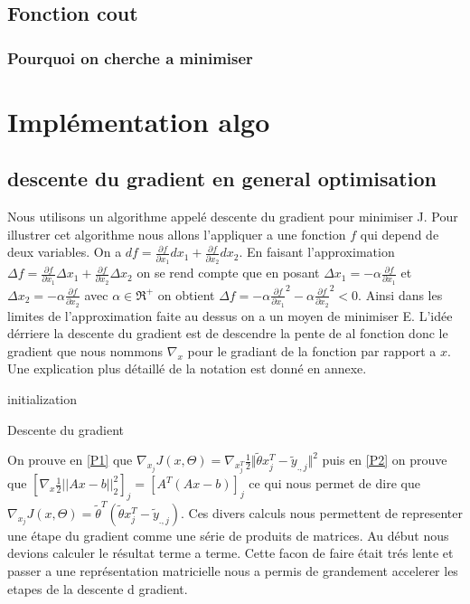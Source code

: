 \documentclass[a4paper,10pt]{article}
\begin{document}
\subsection{Fonction cout}
\subsubsection{Pourquoi on cherche a minimiser}
\section{Implémentation algo}
\subsection{descente du gradient en general optimisation}
Nous utilisons un algorithme appelé descente du gradient pour minimiser J. Pour illustrer cet algorithme nous allons l'appliquer 
a une fonction $f$ qui depend de deux variables.%
 On a $df = \frac{\partial f}{\partial x_{1}}d x_{1} + \frac{\partial f}{\partial x_{2}}dx_{2}$. En faisant l'approximation
 $\Delta f = \frac{\partial f}{\partial x_{1}}\Delta  x_{1} + \frac{\partial f}{\partial x_{2}}\Delta x_{2}$ on se rend compte
 que en posant $\Delta x_{1} = -\alpha \frac{\partial f}{\partial x_{1}}$
 et $\Delta x_{2} = -\alpha \frac{\partial f}{\partial x_{2}}$ avec $\alpha \in \Re^{+}$
 on obtient $\Delta f = -\alpha \frac{\partial f}{\partial x_{1}}^{2} - \alpha \frac{\partial f}{\partial x_{2}}^{2} < 0$. Ainsi dans
 les limites de l'approximation faite au dessus on a un moyen de minimiser E.
L'idée dérriere la descente du gradient 
est de descendre la pente de al fonction donc le gradient que nous nommons $\nabla_{x}$ pour le gradiant de la fonction par rapport 
a $x$. Une explication plus détaillé de la notation est donné en annexe.  
 
\begin{algorithm}[H]
 initialization\;
 \caption{Descente du gradient}
\end{algorithm}
On prouve en \ref{P1} que $ \nabla_{x_{j}}J(x, \Theta) = \nabla_{x_{j}^T}\frac{1}{2}\Vert\tilde{\theta}x_{j}^{T}-\tilde{y}_{.,j}\Vert^{2}$
puis en \ref{P2} on prouve que $[\nabla_{x} \frac{1}{2}||Ax - b||^{2}_{2}]_{j} = [A^{T}(Ax - b)]_{j}$ ce qui nous permet de dire
que $ \nabla_{x_{j}}J(x, \Theta) =  \tilde{\theta}^{T}(\tilde{\theta}x_{j}^{T}-\tilde{y}_{.,j})$. Ces divers calculs nous permettent
de representer une étape du gradient comme une série de produits de matrices. Au début nous devions calculer le résultat terme a terme. Cette
facon de faire était trés lente et passer a une représentation matricielle nous a permis de grandement accelerer les etapes de la descente d gradient.
\end{document}

